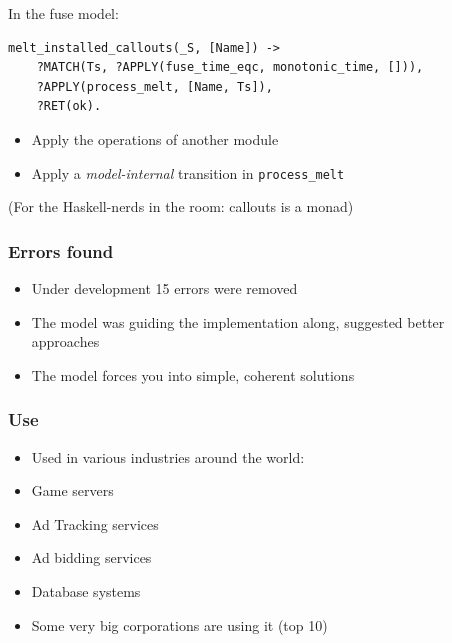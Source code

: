 \documentclass[lualatex]{beamer}
\begin{document}
\begin{frame}[fragile]
  In the fuse model:
  \begin{verbatim}
melt_installed_callouts(_S, [Name]) ->
    ?MATCH(Ts, ?APPLY(fuse_time_eqc, monotonic_time, [])),
    ?APPLY(process_melt, [Name, Ts]),
    ?RET(ok).
\end{verbatim}
  \begin{itemize}
  \item Apply the operations of another module
  \item Apply a \emph{model-internal} transition in \texttt{process\_melt}
  \end{itemize}
  (For the Haskell-nerds in the room: callouts is a monad)
\end{frame}

\begin{frame}
  \frametitle{Errors found}

  \begin{itemize}
  \item Under development 15 errors were removed
  \item The model was guiding the implementation along, suggested
    better approaches
  \item The model forces you into simple, coherent solutions
  \end{itemize}
\end{frame}

\begin{frame}
  \frametitle{Use}
  \begin{itemize}
  \item Used in various industries around the world:
  \item Game servers
  \item Ad Tracking services
  \item Ad bidding services
  \item Database systems
  \item Some very big corporations are using it (top 10)
  \end{itemize}
\end{frame}
\end{document}
